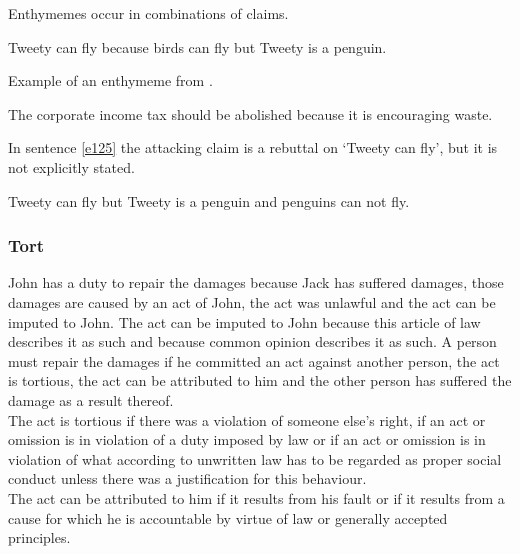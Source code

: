 \noindent Enthymemes occur in combinations of claims.
\begin{exe}
\ex\label{e123} Tweety can fly because birds can fly but Tweety is a penguin.
\end{exe}

\noindent Example of an enthymeme from \citet{Walton:2005dc}.
\begin{exe}
\ex\label{e124} The corporate income tax should be abolished because it is encouraging waste.
\end{exe}

\noindent In sentence \ref{e125} the attacking claim is a rebuttal on `Tweety can fly', but it is not explicitly stated.
\begin{exe}
\ex\label{e125} Tweety can fly but Tweety is a penguin and penguins can not fly.
\end{exe}

\subsubsection{Tort}
\begin{exe}
\ex\label{e126} John has a duty to repair the damages because Jack has suffered damages, those damages are caused by an act of John, the act was unlawful and the act can be imputed to John. The act can be imputed to John because this article of law describes it as such and because common opinion describes it as such.
\ex\label{e127} A person must repair the damages if he committed an act against another person, the act is tortious, the act can be attributed to him and the other person has suffered the damage as a result thereof.\\ The act is tortious if there was a violation of someone else's right, if an act or omission is in violation of a duty imposed by law or if an act or omission is in violation of what according to unwritten law has to be regarded as proper social conduct unless there was a justification for this behaviour.\\ The act can be attributed to him if it results from his fault or if it results from a cause for which he is accountable by virtue of law or generally accepted principles.
\end{exe}

\clearpage